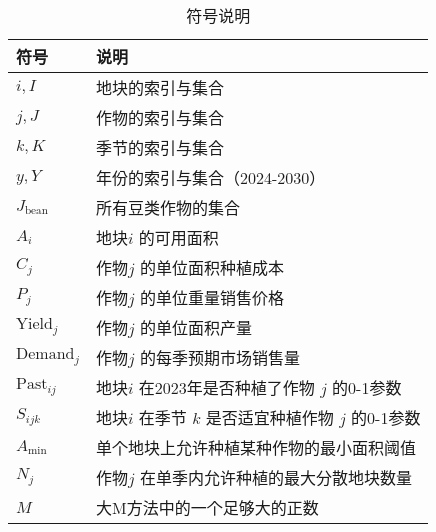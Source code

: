 \begin{table}[H]
	\centering
	\caption{符号说明}
	\begin{tabular}{ll}
		\toprule
		符号                 & 说明                                \\
		\midrule

		$i, I$             & 地块的索引与集合                          \\
		$j, J$             & 作物的索引与集合                          \\
		$k, K$             & 季节的索引与集合                          \\
		$y, Y$             & 年份的索引与集合（2024-2030）               \\
		$J_{\text{bean}}$  & 所有豆类作物的集合                         \\

		$A_i$              & 地块$i$ 的可用面积                       \\
		$C_j$              & 作物$j$ 的单位面积种植成本                   \\
		$P_j$              & 作物$j$ 的单位重量销售价格                   \\
		$\text{Yield}_j$   & 作物$j$ 的单位面积产量                     \\
		$\text{Demand}_j$  & 作物$j$ 的每季预期市场销售量                  \\
		$\text{Past}_{ij}$ & 地块$i$ 在2023年是否种植了作物 $j$ 的0-1参数    \\
		$S_{ijk}$          & 地块$i$ 在季节 $k$ 是否适宜种植作物 $j$ 的0-1参数 \\
		$A_{\min}$         & 单个地块上允许种植某种作物的最小面积阈值              \\
		$N_j$              & 作物$j$ 在单季内允许种植的最大分散地块数量           \\
		$M$                & 大M方法中的一个足够大的正数                    \\
		\bottomrule
	\end{tabular}
\end{table}
